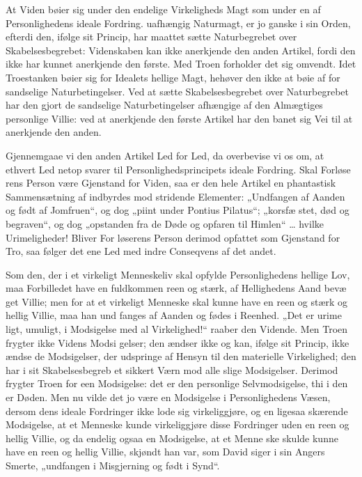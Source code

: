 \documentclass[12pt]{book}
\newcommand{\opage}[1]{\marginnote{\footnotesize\textit{[#1]}}}
\begin{document}
At Viden bøier sig under den endelige Virkeligheds
Magt som under en af Personlighedens ideale Fordring.
uafhængig Naturmagt, er jo ganske i sin Orden, efterdi
den, ifølge sit Princip, har maattet sætte Naturbegrebet
over Skabelsesbegrebet: Videnskaben kan ikke anerkjende
den anden Artikel, fordi den ikke har kunnet anerkjende
den første. Med Troen forholder det sig omvendt. Idet
Troestanken bøier sig for Idealets hellige Magt, hehøver
den ikke at bøie af for sandselige Naturbetingelser.
Ved at sætte Skabelsesbegrebet over Naturbegrebet har
den gjort de sandselige Naturbetingelser afhængige af
den Almægtiges personlige Villie: ved at anerkjende den
første Artikel har den banet sig Vei til at anerkjende
den anden.

Gjennemgaae vi den anden Artikel Led for Led, da
overbevise vi os om, at ethvert Led netop svarer til
Personlighedsprincipets ideale Fordring. Skal Forløse\-%
rens Person være Gjenstand for Viden, saa er den hele
Artikel en phantastisk Sammensætning af indbyrdes mod\-%
stridende Elementer: „Undfangen af Aanden og født af
Jomfruen“, og dog „piint under Pontius Pilatus“; „korsfæ\-%
stet, død og begraven“, og dog „opstanden fra de Døde og
opfaren til Himlen“ \ldots{} hvilke Urimeligheder! Bliver For\-%
løserens Person derimod opfattet som Gjenstand for
\opage{150}\setcounter{footnote}{0}%
Tro, saa følger det ene Led med indre Conseqvens af
det andet.

Som den, der i et virkeligt Menneskeliv skal opfylde
Personlighedens hellige Lov, maa Forbilledet have en
fuldkommen reen og stærk, af Hellighedens Aand bevæ\-%
get Villie; men for at et virkeligt Menneske skal kunne
have en reen og stærk og hellig Villie, maa han und\-%
fanges af Aanden og fødes i Reenhed. „Det er urime\-%
ligt, umuligt, i Modsigelse med al Virkelighed!“ raaber
den Vidende. Men Troen frygter ikke Videns Modsi\-%
gelser; den ændser ikke og kan, ifølge sit Princip, ikke
ændse de Modsigelser, der udspringe af Hensyn til den
materielle Virkelighed; den har i sit Skabelsesbegreb et
sikkert Værn mod alle slige Modsigelser. Derimod
frygter Troen for een Modsigelse: det er den personlige
Selvmodsigelse, thi i den er Døden. Men nu vilde det
jo være en Modsigelse i Personlighedens Væsen, dersom
dens ideale Fordringer ikke lode sig virkeliggjøre, og
en ligesaa skærende Modsigelse, at et Menneske kunde
virkeliggjøre disse Fordringer uden en reen og hellig
Villie, og da endelig ogsaa en Modsigelse, at et Menne\-%
ske skulde kunne have en reen og hellig Villie, skjøndt
han var, som David siger i sin Angers Smerte, „undfangen
i Misgjerning og født i Synd“.
\end{document}
